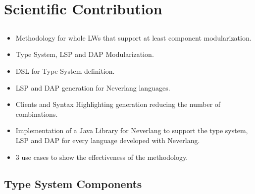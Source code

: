 \documentclass[9pt,xcolor=table,svgnames]{beamer}
\begin{document}


\section[Scientific Contribution]{Scientific Contribution}
\subsection[]{}
\begin{frame}{\secname}
    \framesubtitle{\subsecname}

    \begin{itemize}[itemsep=10pt]
        \item \alert{Methodology} for whole LWs that support at least component modularization.
        \item \alert{Type System},  LSP and DAP \alert{Modularization}.
        \item \alert{DSL} for Type System definition.
        \item \alert{LSP} and \alert{DAP} generation for Neverlang languages.
        \item \alert{Clients} and \alert{Syntax Highlighting} generation reducing the number of combinations.
        \item Implementation of a \alert{Java Library} for \alert{Neverlang} to support the type system, LSP and DAP for every language developed with Neverlang.
        \item 3 \alert{use cases} to show the effectiveness of the methodology.
    \end{itemize}


    \noindent{}%
\end{frame}

\subsection[Type System Components]{Type System Components}
\end{document}

